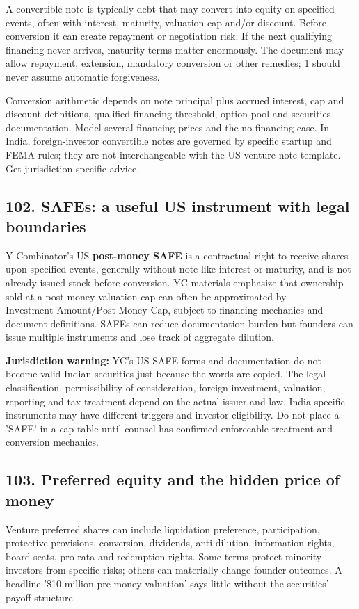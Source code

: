 A convertible note is typically debt that may convert into equity on specified events, often with interest, maturity, valuation cap and/or discount. Before conversion it can create repayment or negotiation risk. If the next qualifying financing never arrives, maturity terms matter enormously. The document may allow repayment, extension, mandatory conversion or other remedies; 1 should never assume automatic forgiveness.

Conversion arithmetic depends on note principal plus accrued interest, cap and discount definitions, qualified financing threshold, option pool and securities documentation. Model several financing prices and the no-financing case. In India, foreign-investor convertible notes are governed by specific startup and FEMA rules; they are not interchangeable with the US venture-note template. Get jurisdiction-specific advice.

\subsection{102. SAFEs: a useful US instrument with legal boundaries}


Y Combinator's US \textbf{post-money SAFE} is a contractual right to receive shares upon specified events, generally without note-like interest or maturity, and is not already issued stock before conversion. YC materials emphasize that ownership sold at a post-money valuation cap can often be approximated by $\text{Investment Amount} / \text{Post-Money Cap}$, subject to financing mechanics and document definitions. SAFEs can reduce documentation burden but founders can issue multiple instruments and lose track of aggregate dilution.

\textbf{Jurisdiction warning:} YC's US SAFE forms and documentation do not become valid Indian securities just because the words are copied. The legal classification, permissibility of consideration, foreign investment, valuation, reporting and tax treatment depend on the actual issuer and law. India-specific instruments may have different triggers and investor eligibility. Do not place a 'SAFE' in a cap table until counsel has confirmed enforceable treatment and conversion mechanics.

\subsection{103. Preferred equity and the hidden price of money}


Venture preferred shares can include liquidation preference, participation, protective provisions, conversion, dividends, anti-dilution, information rights, board seats, pro rata and redemption rights. Some terms protect minority investors from specific risks; others can materially change founder outcomes. A headline '\$10 million pre-money valuation' says little without the securities' payoff structure.

